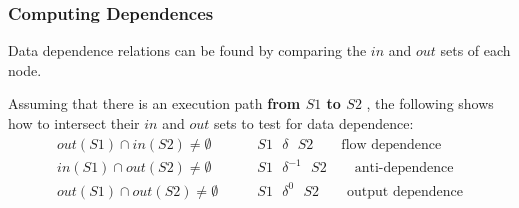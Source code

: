 \subsubsection{Computing Dependences}
\par Data dependence relations can be found by comparing the $in$ and $out$ sets of each node.
\par Assuming that there is an execution path \textbf{from $S1$ to $S2$} , the following shows how to intersect their $in$ and $out$ sets to test for data dependence:
\begin{align*}
    out(S1) \cap in(S2) \neq \emptyset \qquad &S1 \text{ } \delta \text{ } S2 \qquad \text{flow dependence} \\
    in(S1) \cap out(S2) \neq \emptyset \qquad &S1 \text{ } \delta^{-1} \text{ } S2 \qquad \text{anti-dependence} \\
    out(S1) \cap out(S2) \neq \emptyset \qquad &S1 \text{ } \delta^0 \text{ } S2 \qquad \text{output dependence}
\end{align*}

